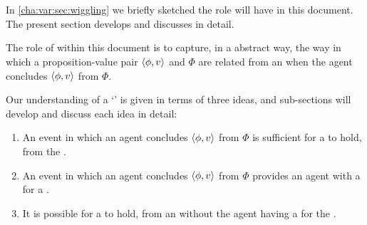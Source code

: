 \section{}
\label{cha:var:ros}

\begin{note}
  In \autoref{cha:var:sec:wiggling} we briefly sketched the role  will have in this document.
  The present section develops and discusses  in detail.

  The role of  within this document is to capture, in a abstract way, the way in which a proposition-value pair \(\langle \phi, v \rangle\) and \poP{} \(\Phi\) are related from an \agpe{} when the agent concludes \(\langle \phi, v \rangle\) from \(\Phi\).
\end{note}

\begin{note}
  Our understanding of a `' is given in terms of three ideas, and sub-sections will develop and discuss each idea in detail:

  \begin{enumerate}[label=, leftmargin=*]
  \item

    An event in which an agent concludes \(\langle \phi, v \rangle\) from \(\Phi\) is sufficient for a \ros{} to hold, from the \agpe{}.
  \item

    An event in which an agent concludes \(\langle \phi, v \rangle\) from \(\Phi\) provides an agent with a  for a \ros{}.
  \item

    It is possible for a \ros{} to hold, from an \agpe{} without the agent having a \wit{} for the \ros{}.
  \end{enumerate}
\end{note}

